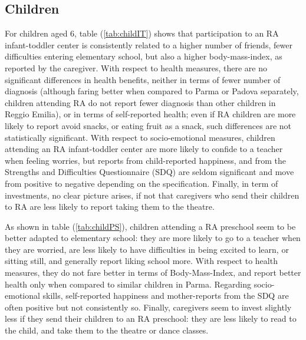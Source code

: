 \documentclass[12pt]{article}
\begin{document}
\subsection{Children}

For children aged 6, table (\ref{tab:childIT}) shows that participation to
an RA infant-toddler center is consistently related to a higher number of
friends, fewer difficulties entering elementary school, but also a higher
body-mass-index, as reported by the caregiver. With respect to health
measures, there are no significant differences in health benefits, neither
in terms of fewer number of diagnosis (although faring better when compared
to Parma or Padova separately, children attending RA do not report fewer
diagnosis than other children in Reggio Emilia), or in terms of
self-reported health; even if RA children are more likely to report avoid
snacks, or eating fruit as a snack, such differences are not statistically
significant. With respect to socio-emotional measures, children attending an
RA infant-toddler center are more likely to confide to a teacher when
feeling worries, but reports from child-reported happiness, and from the
Strengths and Difficulties Questionnaire (SDQ) are seldom significant and
move from positive to negative depending on the specification. Finally, in
term of investments, no clear picture arises, if not that caregivers who
send their children to RA are less likely to report taking them to the
theatre.

As shown in table (\ref{tab:childPS}), children attending a RA preschool
seem to be better adapted to elementary school: they are more likely to go
to a teacher when they are worried, are less likely to have difficulties in
being excited to learn, or sitting still, and generally report liking school
more. With respect to health measures, they do not fare better in terms of
Body-Mass-Index, and report better health only when compared to similar
children in Parma. Regarding socio-emotional skills, self-reported happiness
and mother-reports from the SDQ are often positive but not consistently so.
Finally, caregivers seem to invest slightly less if they send their children
to an RA preschool: they are less likely to read to the child, and take them
to the theatre or dance classes.
\end{document}
